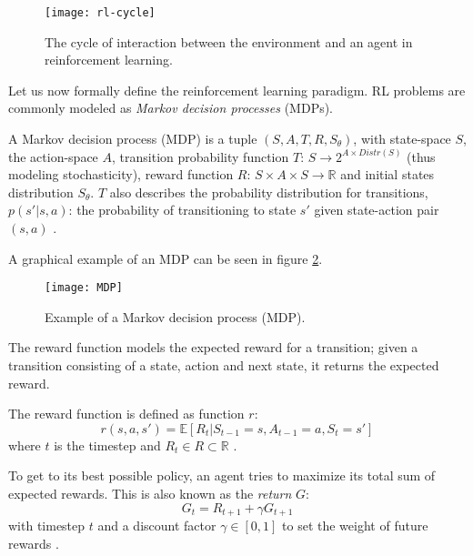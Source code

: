 \begin{figure}[h]
    \centering
    \texttt{[image: rl-cycle]}
    \caption{The cycle of interaction between the environment and an agent in reinforcement learning.}
    \label{fig:rl_cycle}
\end{figure}

Let us now formally define the reinforcement learning paradigm. RL problems are commonly modeled as \emph{Markov decision processes} (MDPs). 

\begin{definition} A Markov decision process (MDP) is a tuple $(S, A, T, R, S_{\theta})$, with state-space $S$, the action-space $A$, transition  probability function $T$: $S \rightarrow 2^{A \times Distr(S)}$ (thus modeling stochasticity), reward function $R$: $S \times A \times S \rightarrow \mathbb{R}$ and initial states distribution $S_{\theta}$. $T$ also describes the probability distribution for transitions, $p(s'|s,a)$: the probability of transitioning to state $s'$ given state-action pair $(s, a)$ \cite[p. 45-62]{grokking}.
\end{definition}

A graphical example of an MDP can be seen in figure \ref{fig:mdp}.

\begin{figure}[h]
    \centering
    \texttt{[image: MDP]}
    \caption{Example of a Markov decision process (MDP).}
    \label{fig:mdp}
\end{figure}

The reward function models the expected reward for a transition; given a transition consisting of a state, action and next state, it returns the expected reward.

The reward function is defined as function $r$:
\begin{equation}
	\label{reward}
	r(s, a, s') = \mathds{E}[R_{t} | S_{t-1} = s, A_{t-1} = a, S_{t} = s']
\end{equation}
where $t$ is the timestep and $R_{t} \in R \subset \mathbb{R}$ \cite[p. 54]{grokking}.

To get to its best possible policy, an agent tries to maximize its total sum of expected rewards. This is also known as the \emph{return} $G$: 
\begin{equation}
G_t = R_{t+1} + \gamma G_{t+1}
\end{equation}
with timestep $t$ and a discount factor $\gamma \in [0,1]$ to set the weight of future rewards \cite[p. 67]{grokking}. 

